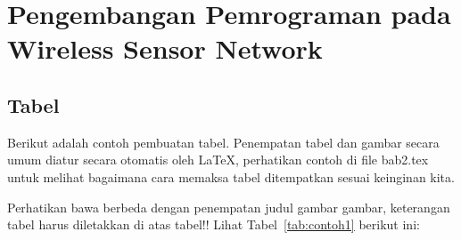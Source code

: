 \section{Pengembangan Pemrograman pada Wireless Sensor Network}
\label{sec:pemrograman_wsn}


\newpage
\subsection{Tabel}  
Berikut adalah contoh pembuatan tabel. 
Penempatan tabel dan gambar secara umum diatur secara otomatis oleh \LaTeX{}, perhatikan contoh di file bab2.tex untuk melihat bagaimana cara memaksa tabel ditempatkan sesuai keinginan kita.

Perhatikan bawa berbeda dengan penempatan judul gambar gambar, keterangan tabel harus diletakkan di atas tabel!!
Lihat Tabel~\ref{tab:contoh1} berikut ini:

